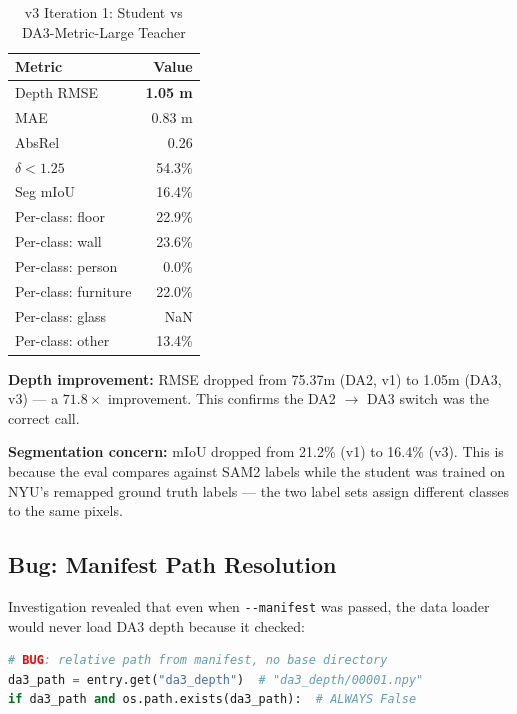 \documentclass[11pt,a4paper]{article}
\begin{document}
\begin{table}[h]
\centering
\caption{v3 Iteration 1: Student vs DA3-Metric-Large Teacher}
\label{tab:v3-iter1-eval}
\begin{tabular}{lr}
\toprule
\textbf{Metric} & \textbf{Value} \\
\midrule
Depth RMSE              & \textcolor{improved}{\textbf{1.05 m}} \\
MAE                     & 0.83 m \\
AbsRel                  & 0.26 \\
$\delta < 1.25$         & 54.3\% \\
\midrule
Seg mIoU                & 16.4\% \\
Per-class: floor        & 22.9\% \\
Per-class: wall         & 23.6\% \\
Per-class: person       & 0.0\% \\
Per-class: furniture    & 22.0\% \\
Per-class: glass        & NaN \\
Per-class: other        & 13.4\% \\
\bottomrule
\end{tabular}
\end{table}

\textbf{Depth improvement:} RMSE dropped from \textcolor{regression}{75.37m}
(DA2, v1) to \textcolor{improved}{1.05m} (DA3, v3) --- a $71.8\times$
improvement. This confirms the DA2 $\to$ DA3 switch was the correct call.

\textbf{Segmentation concern:} mIoU dropped from 21.2\% (v1) to 16.4\%
(v3). This is because the eval compares against SAM2 labels while the
student was trained on NYU's remapped ground truth labels --- the two
label sets assign different classes to the same pixels.

\subsection{Bug: Manifest Path Resolution}

Investigation revealed that even when \texttt{-{}-manifest} was passed,
the data loader would never load DA3 depth because it checked:

\begin{lstlisting}[language=Python]
# BUG: relative path from manifest, no base directory
da3_path = entry.get("da3_depth")  # "da3_depth/00001.npy"
if da3_path and os.path.exists(da3_path):  # ALWAYS False
\end{lstlisting}
\end{document}

